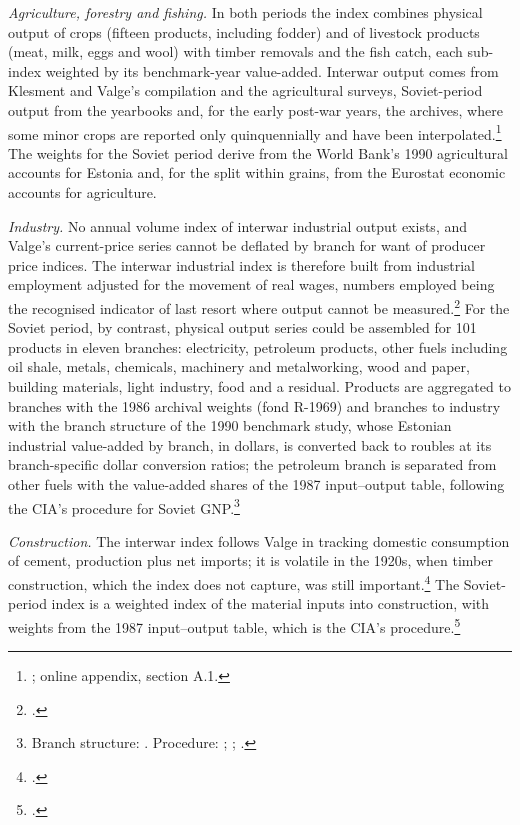 

\textit{Agriculture, forestry and fishing.} In both periods the index combines physical output of crops (fifteen products, including fodder) and of livestock products (meat, milk, eggs and wool) with timber removals and the fish catch, each sub-index weighted by its benchmark-year value-added. Interwar output comes from Klesment and Valge's compilation and the agricultural surveys, Soviet-period output from the yearbooks and, for the early post-war years, the archives, where some minor crops are reported only quinquennially and have been interpolated.\footnote{\autocite{klesment2007}; online appendix, section A.1.} The weights for the Soviet period derive from the World Bank's 1990 agricultural accounts for Estonia and, for the split within grains, from the Eurostat economic accounts for agriculture.

\textit{Industry.} No annual volume index of interwar industrial output exists, and Valge's current-price series cannot be deflated by branch for want of producer price indices. The interwar industrial index is therefore built from industrial employment adjusted for the movement of real wages, numbers employed being the recognised indicator of last resort where output cannot be measured.\footnote{\autocite[427]{thomasfeinstein2003}.} For the Soviet period, by contrast, physical output series could be assembled for 101 products in eleven branches: electricity, petroleum products, other fuels including oil shale, metals, chemicals, machinery and metalworking, wood and paper, building materials, light industry, food and a residual. Products are aggregated to branches with the 1986 archival weights (fond R-1969) and branches to industry with the branch structure of the 1990 benchmark study, whose Estonian industrial value-added by branch, in dollars, is converted back to roubles at its branch-specific dollar conversion ratios; the petroleum branch is separated from other fuels with the value-added shares of the 1987 input--output table, following the CIA's procedure for Soviet GNP.\footnote{Branch structure: \autocite[190, table 5]{bolotin1992}. Procedure: \autocite[48]{cia1982a}; \autocite[66--9]{wbinputoutput1987}; \autocite[310, 312]{Maddison1998b}.}

\textit{Construction.} The interwar index follows Valge in tracking domestic consumption of cement, production plus net imports; it is volatile in the 1920s, when timber construction, which the index does not capture, was still important.\footnote{\autocite[Table 35]{valge2003all}.} The Soviet-period index is a weighted index of the material inputs into construction, with weights from the 1987 input--output table, which is the CIA's procedure.\footnote{\autocite[66--89]{wbinputoutput1987}.}

